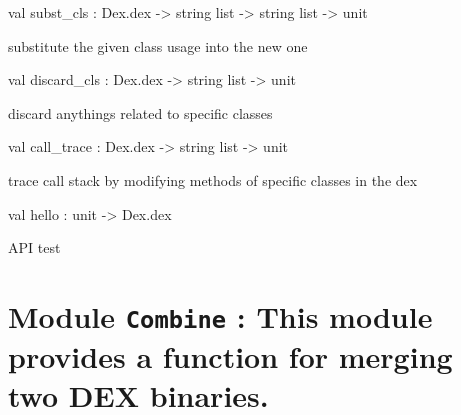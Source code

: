 \documentclass[11pt]{article}
\begin{document}
\label{val:Modify.subst-underscorecls}\begin{ocamldoccode}
val subst_cls : Dex.dex -> string list -> string list -> unit
\end{ocamldoccode}
\begin{ocamldocdescription}
substitute the given class usage into the new one


\end{ocamldocdescription}




\label{val:Modify.discard-underscorecls}\begin{ocamldoccode}
val discard_cls : Dex.dex -> string list -> unit
\end{ocamldoccode}
\begin{ocamldocdescription}
discard anythings related to specific classes


\end{ocamldocdescription}




\label{val:Modify.call-underscoretrace}\begin{ocamldoccode}
val call_trace : Dex.dex -> string list -> unit
\end{ocamldoccode}
\begin{ocamldocdescription}
trace call stack by modifying methods of specific classes in the dex


\end{ocamldocdescription}




\label{val:Modify.hello}\begin{ocamldoccode}
val hello : unit -> Dex.dex
\end{ocamldoccode}
\begin{ocamldocdescription}
API test


\end{ocamldocdescription}


\section{Module {\tt{Combine}} : This module provides a function for merging two DEX binaries.}
\label{module:Combine}




\ocamldocvspace{0.5cm}
\end{document}
